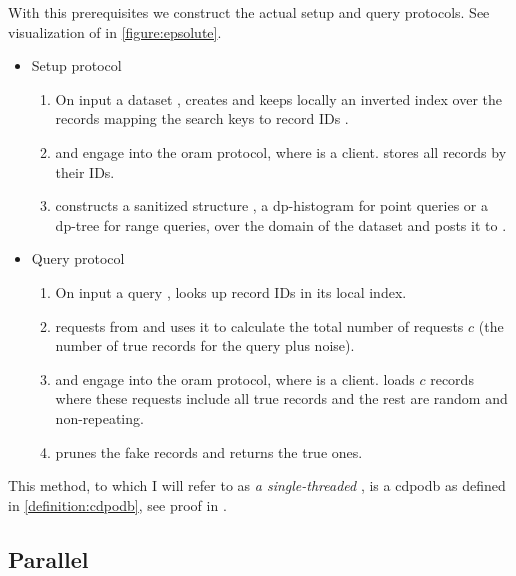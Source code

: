 			With this prerequisites we construct the actual setup and query protocols.
			See visualization of \protocolQuery{} in \cref{figure:epsolute}.
			\begin{itemize}
				\item
					Setup protocol \protocolSetup{}
					\begin{enumerate}
						\item
							On input a dataset \database{}, \user{} creates and keeps locally an inverted index over the records mapping the search keys \searchKey{} to record IDs \recordID{}.
						\item
							\user{} and \server{} engage into the \acrshort{oram} protocol, where \user{} is a client.
							\user{} stores all records by their IDs.
						\item
							\user{} constructs a sanitized structure \serverDS{}, a \acrshort{dp}-histogram for point queries or a \acrshort{dp}-tree for range queries, over the domain of the dataset and posts it to \server{}.
					\end{enumerate}
				\item
					Query protocol \protocolQuery{}
					\begin{enumerate}
						\item
							On input a query \query{}, \user{} looks up record IDs in its local index.
						\item
							\user{} requests \serverDS{} from \server{} and uses it to calculate the total number of requests $c$ (the number of true records for the query plus noise).
						\item
							\user{} and \server{} engage into the \acrshort{oram} protocol, where \user{} is a client.
							\user{} loads $c$ records where these requests include all true records and the rest are random and non-repeating.
						\item
							\user{} prunes the fake records and returns the true ones.
					\end{enumerate}
			\end{itemize}

			

			This method, to which I will refer to as \emph{a single-threaded \epsolute{}}, is a \acrlong{cdpodb} as defined in \cref{definition:cdpodb}, see proof in \cite[Section 4.2]{epsolute}.

		\subsection{Parallel \epsolute{}}\label{section:range-queries-persistent:parallel-epsolute}

